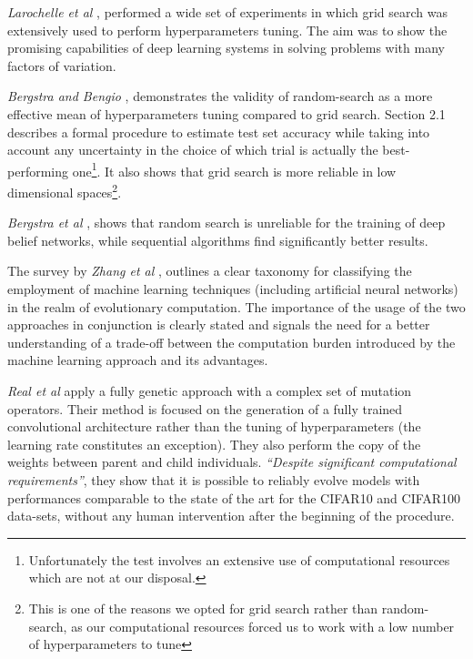 \documentclass{article}
\begin{document}
\textit{Larochelle et al} \cite{Larochelle:2007:EED:1273496.1273556}, performed a wide set of experiments in which grid search was extensively used to perform hyperparameters tuning. The aim was to show the promising capabilities of deep learning systems in solving problems with many factors of variation.

\textit{Bergstra and Bengio} \cite{Bergstra:2012:RSH:2188385.2188395}, demonstrates the validity of random-search as a more effective mean of hyperparameters tuning compared to grid search. Section 2.1 describes a formal procedure to estimate test set accuracy while taking into account any uncertainty in the choice of which trial is actually the best-performing one\footnote{Unfortunately the test involves an extensive use of computational resources which are not at our disposal.}. It also shows that grid search is more reliable in low dimensional spaces\footnote{This is one of the reasons we opted for grid search rather than random-search, as our computational resources forced us to work with a low number of hyperparameters to tune}.

\textit{Bergstra et al} \cite{Bergstra:2011:AHO:2986459.2986743}, shows that random search is unreliable for the training of deep belief networks, while sequential algorithms find significantly better results.

The survey by \textit{Zhang et al} \cite{Zhang:2011:ECM:2772968.2773017}, outlines a clear taxonomy for classifying the employment of machine learning techniques (including artificial neural networks) in the realm of evolutionary computation. The importance of the usage of the two approaches in conjunction is clearly stated and signals the need for a better understanding of a trade-off between the computation burden introduced by the machine learning approach and its advantages.

\textit{Real et al}\cite{pmlr-v70-real17a} apply a fully genetic approach with a complex set of mutation operators. Their method is focused on the generation of a fully trained convolutional architecture rather than the tuning of hyperparameters (the learning rate constitutes an exception). They also perform the copy of the weights between parent and child individuals. \textit{``Despite significant computational requirements''}\cite{pmlr-v70-real17a}, they show that it is possible to reliably evolve models with performances comparable to the state of the art for the CIFAR10\cite{CIFAR10} and CIFAR100\cite{CIFAR100} data-sets, without any human intervention after the beginning of the procedure.
\end{document}
